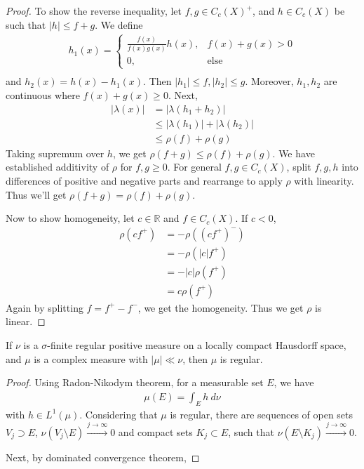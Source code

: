\begin{proof}
  To show the reverse inequality, let $f, g \in C_c(X)^+$, and $h \in
  C_c(X)$ be such that $|h| \le f + g$. We define
  \begin{align*}
    h_1(x) =
    \begin{cases}
      \frac{f(x)}{f(x) g(x)}h(x), &f(x) + g(x) > 0 \\
      0, &\textrm{else}
    \end{cases} \\
  \end{align*}
  and $h_2(x) = h(x) - h_1(x)$. Then $|h_1| \le f, |h_2| \le g$.
  Moreover, $h_1, h_2$ are continuous where $ f(x) + g(x) \ge 0$. Next,
  \begin{align*}
    |\lambda(x)| &= |\lambda(h_1 + h_2)| \\
    & \le | \lambda(h_1)| + | \lambda(h_2)| \\
    & \le \rho(f) + \rho(g)
  \end{align*}
  Taking supremum over $h$, we get $\rho(f + g) \le \rho(f) +
  \rho(g)$. We have established additivity of $\rho$ for $f, g \ge 0$.
  For general $ f, g \in C_c(X)$, split $f, g, h$ into differences of
  positive and negative parts and rearrange to apply $\rho$ with
  linearity. Thus we'll get $\rho(f +g) = \rho(f) + \rho(g)$.

  Now to show homogeneity, let $  c \in \mathbb{R}$ and $f \in
  C_c(X)$. If $c < 0$,
  \begin{align*}
    \rho(cf^+) & = - \rho((cf^+)^-) \\
    &= - \rho(|c|f^+) \\
    &= - |c| \rho(f^+) \\
    &= c \rho(f^+)
  \end{align*}
  Again by splitting $f = f^+ - f^-$, we get the homogeneity. Thus we
  get $\rho$ is linear.
\end{proof}

\begin{lemma}
  If $\nu$ is a $\sigma$-finite regular positive measure on a locally compact
  Hausdorff space, and $  \mu$ is a complex measure with $|\mu| \ll
  \nu$, then $\mu$ is regular.
\end{lemma}
\begin{proof}
  Using Radon-Nikodym theorem, for a measurable set $E$, we have
  \begin{align*}
    \mu(E) = \int_E h \ d \nu
  \end{align*}
  with $h \in L^{1}(\mu)$. Considering that $\mu$ is regular, there
  are sequences  of open sets $V_j \supset E$, $\nu(V_j \setminus E)
  \stackrel{ j \to \infty}{\longrightarrow} 0$ and compact sets $K_j
  \subset E$, such that $\nu(E \setminus K_j) \stackrel{j \to
  \infty}{\longrightarrow} 0$.

  Next, by dominated convergence theorem,
\end{proof}

